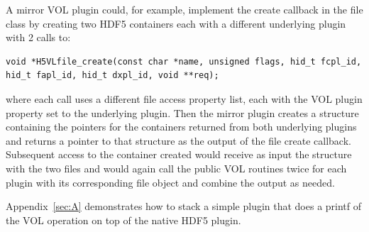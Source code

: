 A mirror VOL plugin could, for example, implement the create callback in the file class by creating two HDF5 containers each with a different underlying plugin with 2 calls to:
\begin{lstlisting}
void *H5VLfile_create(const char *name, unsigned flags, hid_t fcpl_id, hid_t fapl_id, hid_t dxpl_id, void **req);
\end{lstlisting}
where each call uses a different file access property list, each with the VOL plugin property set to the underlying plugin. Then the mirror plugin creates a structure containing the pointers for the containers returned from both underlying plugins and returns a pointer to that structure as the output of the file create callback. Subsequent access to the container created would receive as input the structure with the two files and would again call the public VOL routines twice for each plugin with its corresponding file object and combine the output as needed. 

Appendix~\ref{sec:A} demonstrates how to stack a simple plugin that does a printf of the VOL operation on top of the native HDF5 plugin.

\pagebreak

